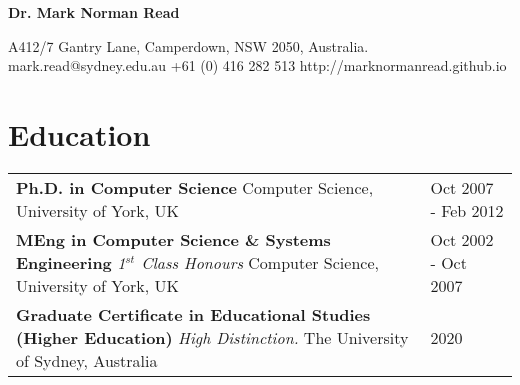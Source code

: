 \documentclass[a4paper]{article}
\begin{document}
\begin{center}
\LARGE{\textbf{Dr. Mark Norman Read}}\vspace{3mm}\\
\end{center}


\begin{center}
A412/7 Gantry Lane, Camperdown, NSW 2050, Australia.\\
mark.read@sydney.edu.au \hspace{1cm} +61 (0) 416 282 513 \hspace{1cm} http://marknormanread.github.io\\
\end{center}

\section*{Education}


\begin{tabular}{p{12cm}p{6cm}}

    \textbf{Ph.D. in Computer Science}\newline
    Computer Science, University of York, UK
    \vspace{3mm}
    &
    Oct 2007 - Feb 2012\\

    \textbf{MEng in Computer Science \& Systems Engineering}\newline
    \textit{1$^{st}$ Class Honours}\newline
    Computer Science, University of York, UK
    \vspace{3mm}
    &
    Oct 2002 - Oct 2007\\

    \textbf{Graduate Certificate in Educational Studies (Higher Education)} \newline
    \textit{High Distinction.}\newline
    The University of Sydney, Australia
    \vspace{3mm}
    &
    2020\\
\end{tabular}
\end{document}
